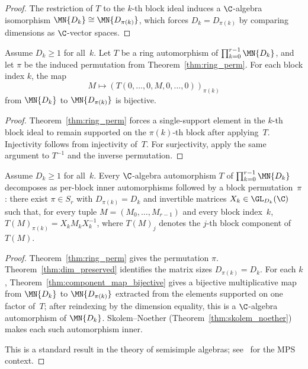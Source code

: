 \begin{proof}\leanok{}
    The restriction of $T$ to the $k$-th block ideal
    induces a $\C$-algebra isomorphism
    $\MN{D_k} \cong \MN{D_{\pi(k)}}$,
    which forces $D_k = D_{\pi(k)}$
    by comparing dimensions as $\C$-vector spaces.
\end{proof}

\begin{theorem}\label{thm:component_map_bijective}
    \leanok
    Assume $D_k \ge 1$ for all~$k$.
    Let $T$ be a ring automorphism of $\prod_{k=0}^{r-1} \MN{D_k}$, and let $\pi$
    be the induced permutation from Theorem~\ref{thm:ring_perm}.
    For each block index $k$, the map
    \[
        M \mapsto (T(0, \ldots, 0, M, 0, \ldots, 0))_{\pi(k)}
    \]
    from $\MN{D_k}$ to $\MN{D_{\pi(k)}}$ is bijective.
\end{theorem}

\begin{proof}
    \leanok
    Theorem~\ref{thm:ring_perm} forces a single-support element in the $k$-th
    block ideal to remain supported on the $\pi(k)$-th block after applying~$T$.
    Injectivity follows from injectivity of~$T$.
    For surjectivity, apply the same argument to $T^{-1}$ and the inverse
    permutation.
\end{proof}

\begin{theorem}\label{thm:pi_auto_decomp}
    \leanok
    Assume $D_k \ge 1$ for all~$k$.
    Every $\C$-algebra automorphism $T$ of $\prod_{k=0}^{r-1} \MN{D_k}$
    decomposes as per-block inner automorphisms followed by a block
    permutation~$\pi$:
    there exist $\pi \in S_r$ with $D_{\pi(k)} = D_k$
    and invertible matrices $X_k \in \GL_{D_k}(\C)$ such that,
    for every tuple $M = (M_0,\ldots,M_{r-1})$ and every block index~$k$,
    $T(M)_{\pi(k)} = X_k M_k X_k^{-1}$,
    where $T(M)_j$ denotes the $j$-th block component of $T(M)$.
\end{theorem}

\begin{proof}
    \leanok
    Theorem~\ref{thm:ring_perm} gives the permutation $\pi$.
    Theorem~\ref{thm:dim_preserved} identifies the matrix sizes
    $D_{\pi(k)} = D_k$.
    For each $k$, Theorem~\ref{thm:component_map_bijective} gives a bijective
    multiplicative map from $\MN{D_k}$ to $\MN{D_{\pi(k)}}$ extracted from the
    elements supported on one factor of~$T$; after reindexing by the dimension equality,
    this is a $\C$-algebra automorphism of $\MN{D_k}$.
    Skolem--Noether (Theorem~\ref{thm:skolem_noether}) makes each such
    automorphism inner.

    This is a standard result in the theory of semisimple algebras;
    see~\cite[Section~IV.A]{Cirac2021Matrix} for the MPS context.
\end{proof}

